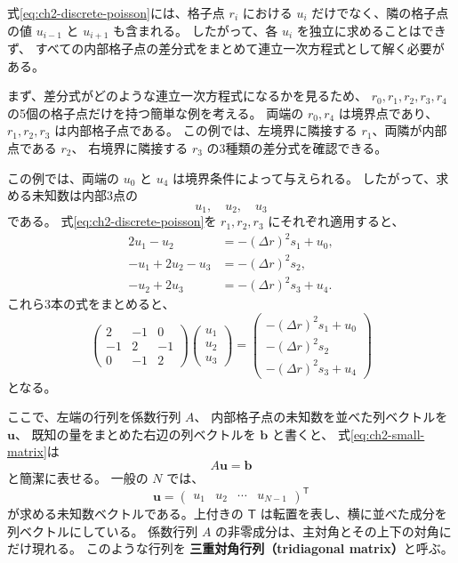式\eqref{eq:ch2-discrete-poisson}には、格子点 $r_i$ における
$u_i$ だけでなく、隣の格子点の値 $u_{i-1}$ と $u_{i+1}$ も含まれる。
したがって、各 $u_i$ を独立に求めることはできず、
すべての内部格子点の差分式をまとめて連立一次方程式として解く必要がある。

まず、差分式がどのような連立一次方程式になるかを見るため、
$r_0,r_1,r_2,r_3,r_4$ の5個の格子点だけを持つ簡単な例を考える。
両端の $r_0,r_4$ は境界点であり、$r_1,r_2,r_3$ は内部格子点である。
この例では、左境界に隣接する $r_1$、両隣が内部点である $r_2$、
右境界に隣接する $r_3$ の3種類の差分式を確認できる。

この例では、両端の $u_0$ と $u_4$ は境界条件によって与えられる。
したがって、求める未知数は内部3点の
\begin{equation}
 u_1,\quad u_2,\quad u_3
\end{equation}
である。
式\eqref{eq:ch2-discrete-poisson}を
$r_1,r_2,r_3$ にそれぞれ適用すると、
\begin{align}
 2u_1-u_2
 &=-(\Delta r)^2s_1+u_0,\\
 -u_1+2u_2-u_3
 &=-(\Delta r)^2s_2,\\
 -u_2+2u_3
 &=-(\Delta r)^2s_3+u_4.
\end{align}
これら3本の式をまとめると、
\begin{equation}
 \begin{pmatrix}
 2&-1&0\\
 -1&2&-1\\
 0&-1&2
 \end{pmatrix}
 \begin{pmatrix}u_1\\u_2\\u_3\end{pmatrix}
 =
 \begin{pmatrix}
 -(\Delta r)^2s_1+u_0\\
 -(\Delta r)^2s_2\\
 -(\Delta r)^2s_3+u_4
 \end{pmatrix}
\label{eq:ch2-small-matrix}
\end{equation}
となる。

ここで、左端の行列を係数行列 $A$、
内部格子点の未知数を並べた列ベクトルを $\boldsymbol{u}$、
既知の量をまとめた右辺の列ベクトルを $\boldsymbol{b}$ と書くと、
式\eqref{eq:ch2-small-matrix}は
\begin{equation}
 A\boldsymbol{u}=\boldsymbol{b}
\label{eq:ch2-linear-system}
\end{equation}
と簡潔に表せる。
一般の $N$ では、
\begin{equation}
 \boldsymbol{u}
 =
 \begin{pmatrix}
 u_1&u_2&\cdots&u_{N-1}
 \end{pmatrix}^{\mathsf T}
\end{equation}
が求める未知数ベクトルである。上付きの $\mathsf{T}$ は転置を表し、横に並べた成分を列ベクトルにしている。
係数行列 $A$ の非零成分は、主対角とその上下の対角にだけ現れる。
このような行列を
\textbf{三重対角行列（tridiagonal matrix）}と呼ぶ。

